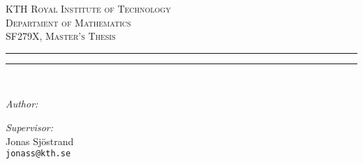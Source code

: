 \begin{titlepage}
\begin{center}

\makeatletter


\textsc{{\LARGE KTH Royal Institute of Technology}
\\[0.3cm]
{\large Department of Mathematics}
\\[0.7cm]
{\Large SF279X, Master's Thesis}}\\[0.5cm]

\noindent
\rule{\linewidth}{0.2mm}
{ \begin{spacing}{1.5} \Huge \bfseries \@title \end{spacing} }
\noindent
\rule{\linewidth}{0.2mm}\\[1.5cm]

\begin{minipage}{0.4\textwidth}
\begin{flushleft} \large
\emph{Author:}\\
\@author
\end{flushleft}
\end{minipage}
\begin{minipage}{0.4\textwidth}
\begin{flushright} \large
\emph{Supervisor:} \\
Jonas Sj\"ostrand\\
\texttt{jonass@kth.se}
\end{flushright}
\end{minipage}

\vfill

{\large \@date}

\makeatother

\end{center}
\end{titlepage}
